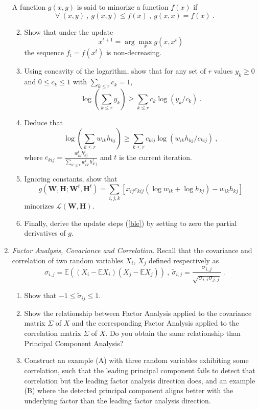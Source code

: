 \documentclass{article}
\newcommand{\E}{\mathbb{E}}
\begin{document}
\begin{enumerate}
A function $g(x,y)$ is said to minorize a function $f(x)$ if 
$$\forall~(x,y)~,~g(x,y) \leq f(x)~,~g(x,x) = f(x)~.$$
\begin{enumerate}
\setcounter{enumi}{1}
\item Show that under the update 
$$x^{t+1} = \arg\max_x g(x,x^t)$$
the sequence $f_t = f(x^t)$ is non-decreasing. 
\item Using concavity of the logarithm, show that for any set of $r$ values $y_k \geq 0$ 
and $0 \leq c_k \leq 1$ with $\sum_{k \leq r} c_k = 1$, 
$$\log \left( \sum_{k \leq r} y_k \right) \geq \sum_{k \leq r} c_k \log( y_k / c_k)~.$$
\item Deduce that 
$$\log \left( \sum_{k \leq r} w_{ik} h_{kj} \right) \geq \sum_{k \leq r} c_{kij} \log( w_{ik} h_{kj} / c_{kij})~,$$
where $c_{kij} = \frac{w_{ik}^t h_{kj}^t}{ \sum_{k' \leq r} w_{ik'}^t h_{k'j}^t} $ and $t$ is the current iteration.
\item Ignoring constants, show that 
$$g(\mathbf{W}, \mathbf{H}; \mathbf{W}^t, \mathbf{H}^t) = \sum_{i,j,k} [x_{ij} c_{kij} (\log w_{ik} + \log h_{kj}) - w_{ik}h_{kj} ]$$
minorizes $\mathcal{L}(\mathbf{W}, \mathbf{H})$. 
\item Finally, derive the update steps (\ref{ble}) by setting to zero the partial derivatives of $g$.
\end{enumerate}

\item \emph{Factor Analysis, Covariance and Correlation}. 
Recall that the covariance and correlation of two random variables $X_i$, $X_j$ defined respectively as 
$$\sigma_{i,j} = \E( (X_i - \E X_i)(X_j - \E X_j))~,~\tilde{\sigma}_{i,j} = \frac{\sigma_{i,j}}{\sqrt{\sigma_{i,i} \sigma_{j,j}}}~.$$
\begin{enumerate}
\item Show that $-1 \leq \tilde{\sigma}_{ij} \leq 1$.
\item Show the relationship between Factor Analysis applied to the covariance matrix $\Sigma$ of $X$ and the corresponding Factor Analysis applied to the correlation matrix $\tilde{\Sigma}$ of $X$. Do you obtain the same relationship than Principal Component Analysis? 
\item Construct an example (A) with three random variables exhibiting some correlation, such that the leading principal component fails to detect that correlation but the leading factor analysis direction does, and an example (B) where the detected principal component aligns better with the underlying factor than the leading factor analysis direction.


\end{enumerate}
\end{enumerate}
\end{document}
